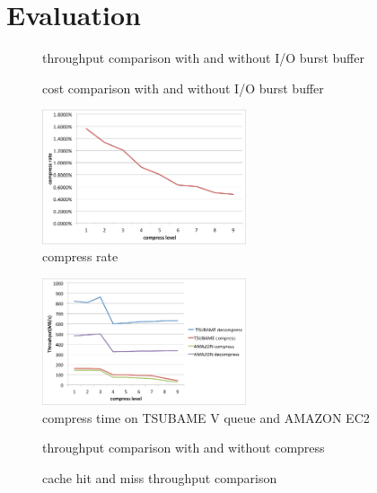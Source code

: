 \section{Evaluation}

\begin{figure}[tb]
	\centering
	\caption{throughput comparison with and without I/O burst buffer}
	\label{throughput}
\end{figure}

\begin{figure}[tb]
	\centering
	\caption{cost comparison with and without I/O burst buffer}
	\label{cost}
\end{figure}

\begin{figure}[tb]
	\centering
	\includegraphics[width=6cm]{compress_rate}
	\caption{compress rate}
	\label{compress rate}
\end{figure}

\begin{figure}[tb]
	\centering
	\includegraphics[width=6cm]{compress_time}
	\caption{compress time on TSUBAME V queue and AMAZON EC2}
	\label{compress time}
\end{figure}

\begin{figure}[tb]
	\centering
	\caption{throughput comparison with and without compress}
	\label{compress}
\end{figure}

\begin{figure}[tb]
	\centering
	\caption{cache hit and miss throughput comparison}
	\label{cache hit}
\end{figure}

